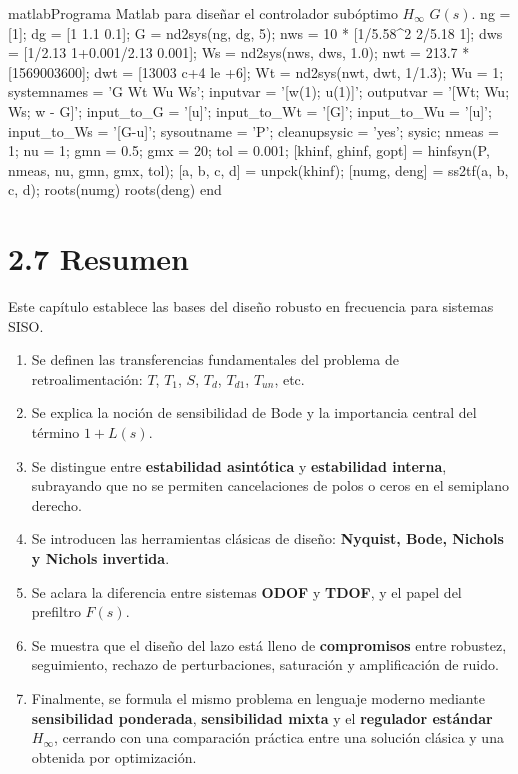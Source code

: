 \begin{sourcecode}{matlab}{Programa Matlab para diseñar el controlador subóptimo \(H_\infty\) \(G(s)\).}
ng = [1];
dg = [1 1.1 0.1];
G = nd2sys(ng, dg, 5); %
nws = 10 * [1/5.58^2 2/5.18 1];
dws = [1/2.13 1+0.001/2.13 0.001];
Ws = nd2sys(nws, dws, 1.0);
nwt = 213.7 * [1569003600];
dwt = [13003 c+4 le +6];
Wt = nd2sys(nwt, dwt, 1/1.3);
Wu = 1;
systemnames = 'G Wt Wu Ws';
inputvar = '[w(1); u(1)]';
outputvar = '[Wt; Wu; Ws; w - G]';
input_to_G = '[u]';
input_to_Wt = '[G]';
input_to_Wu = '[u]';
input_to_Ws = '[G-u]';
sysoutname = 'P';
cleanupsysic = 'yes';
sysic;
nmeas = 1;
nu = 1;
gmn = 0.5;
gmx = 20;
tol = 0.001;
[khinf, ghinf, gopt] = hinfsyn(P, nmeas, nu, gmn, gmx, tol);
[a, b, c, d] = unpck(khinf);
[numg, deng] = ss2tf(a, b, c, d);
roots(numg)
roots(deng)
end
\end{sourcecode}

\section{2.7 Resumen}
Este capítulo establece las bases del diseño robusto en frecuencia para sistemas SISO.

\begin{enumerate}
  \item Se definen las transferencias fundamentales del problema de retroalimentación: \(T\), \(T_1\), \(S\), \(T_d\), \(T_{d1}\), \(T_{un}\), etc.
  \item Se explica la noción de sensibilidad de Bode y la importancia central del término \(1+L(s)\).
  \item Se distingue entre \textbf{estabilidad asintótica} y \textbf{estabilidad interna}, subrayando que no se permiten cancelaciones de polos o ceros en el semiplano derecho.
  \item Se introducen las herramientas clásicas de diseño: \textbf{Nyquist, Bode, Nichols y Nichols invertida}.
  \item Se aclara la diferencia entre sistemas \textbf{ODOF} y \textbf{TDOF}, y el papel del prefiltro \(F(s)\).
  \item Se muestra que el diseño del lazo está lleno de \textbf{compromisos} entre robustez, seguimiento, rechazo de perturbaciones, saturación y amplificación de ruido.
  \item Finalmente, se formula el mismo problema en lenguaje moderno mediante \textbf{sensibilidad ponderada}, \textbf{sensibilidad mixta} y el \textbf{regulador estándar \(H_\infty\)}, cerrando con una comparación práctica entre una solución clásica y una obtenida por optimización.
\end{enumerate}

